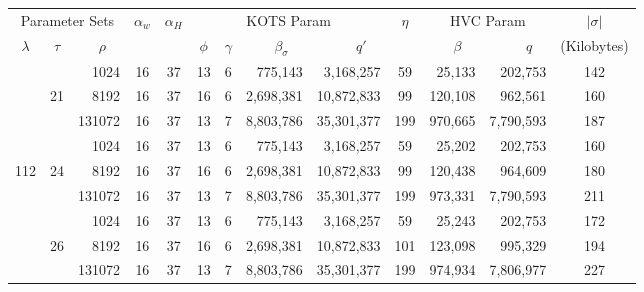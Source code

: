 \begin{table}\centering
  \begin{tabular}{|c|c|r||c|c||c|c|r|r||c||r|r||c|}\hline

    \multicolumn{3}{|c||}{Parameter Sets}  
    & \multirow{2}{*}{$\alpha_w$}  
    & \multirow{2}{*}{$\alpha_H$}   &  \multicolumn{4}{c||}{KOTS Param}  
    & \multirow{2}{*}{$\eta$}       & \multicolumn{2}{c||}{HVC Param}  
    &  $|\sigma|$\\\cline{1-3}\cline{6-9}\cline{11-12}
    
    $\lambda$      & $\tau$
    & $\rho\quad$&   && $\phi$ 
    & $\gamma$                      & $\beta_\sigma\quad$     
    & $q'\quad$                     &        
    & $\beta\quad$                  & $q\quad$ 
    & (Kilobytes) \\\hline\hline


    &       &   1024 &         16 &        37 &         13 &       6 &        775,143 &  3,168,257 &    59 &       25,133 &   202,753 & 142 \\\cline{3-13}
    &    21 &   8192 &         16 &        37 &         16 &       6 &      2,698,381 & 10,872,833 &    99 &      120,108 &   962,561 & 160 \\\cline{3-13}
    &       & 131072 &         16 &        37 &         13 &       7 &      8,803,786 & 35,301,377 &   199 &      970,665 & 7,790,593 & 187 \\\cline{2-13}

    &       &   1024 &         16 &        37 &         13 &       6 &        775,143 &  3,168,257 &    59 &       25,202 &   202,753 & 160 \\\cline{3-13}
112 &    24 &   8192 &         16 &        37 &         16 &       6 &      2,698,381 & 10,872,833 &    99 &      120,438 &   964,609 & 180 \\\cline{3-13}
    &       & 131072 &         16 &        37 &         13 &       7 &      8,803,786 & 35,301,377 &   199 &      973,331 & 7,790,593 & 211 \\\cline{2-13}

    &       &   1024 &         16 &        37 &         13 &       6 &        775,143 &  3,168,257 &    59 &       25,243 &   202,753 & 172 \\\cline{3-13}
    &    26 &   8192 &         16 &        37 &         16 &       6 &      2,698,381 & 10,872,833 &   101 &      123,098 &   995,329 & 194 \\\cline{3-13}
    &       & 131072 &         16 &        37 &         13 &       7 &      8,803,786 & 35,301,377 &   199 &      974,934 & 7,806,977 & 227 \\\hline\hline


\end{tabular}
\end{table}
